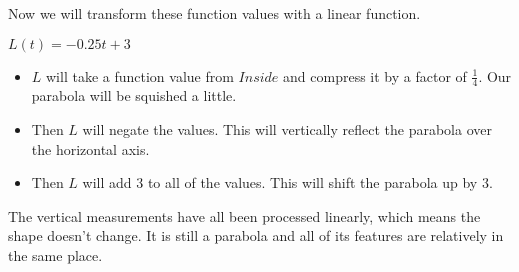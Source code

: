 \documentclass{ximera}
\begin{document}
Now we will transform these function values with a linear function.


$L(t) = -0.25 t + 3$


\begin{itemize}
\item $L$ will take a function value from $Inside$ and compress it by a factor of $\frac{1}{4}$. Our parabola will be squished a little. 
\item Then $L$ will negate the values.  This will vertically reflect the parabola over the horizontal axis.
\item Then $L$ will add $3$ to all of the values.  This will shift the parabola up by $3$.
\end{itemize}












\begin{image}
\end{image}

The vertical measurements have all been processed linearly, which means the shape doesn't change.  It is still a parabola and all of its features are relatively in the same place.
\end{document}
